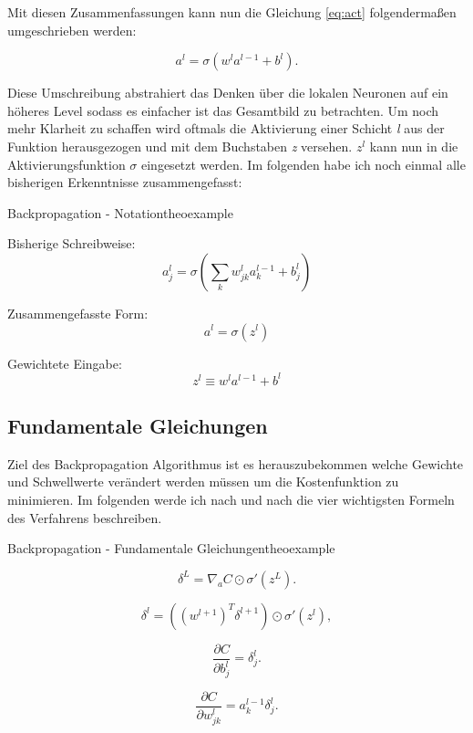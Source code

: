 Mit diesen Zusammenfassungen kann nun die Gleichung \ref{eq:act} folgendermaßen umgeschrieben werden: 

\begin{equation}
  a^{l} = \sigma(w^l a^{l-1}+b^l).
\end{equation}

Diese Umschreibung abstrahiert das Denken über die lokalen Neuronen auf ein höheres Level sodass es einfacher ist das Gesamtbild zu betrachten. Um noch mehr Klarheit zu schaffen wird oftmals die Aktivierung einer Schicht \emph{l} aus der Funktion herausgezogen und mit dem Buchstaben \emph{z} versehen. $z^l$ kann nun in die Aktivierungsfunktion $\sigma$ eingesetzt werden. Im folgenden habe ich noch einmal alle bisherigen Erkenntnisse zusammengefasst: 

\begin{mytheo}{Backpropagation - Notation}{theoexample}

Bisherige Schreibweise:
\begin{equation}
  a^{l}_j = \sigma\left( \sum_k w^{l}_{jk} a^{l-1}_k + b^l_j \right) \nonumber
\end{equation}

Zusammengefasste Form:
\begin{equation}
a^l = \sigma(z^l)
\end{equation}

Gewichtete Eingabe:
\begin{equation}
  z^l \equiv w^l a^{l-1}+b^l
\end{equation}

\end{mytheo}

\subsection{Fundamentale Gleichungen}

Ziel des Backpropagation Algorithmus ist es herauszubekommen welche Gewichte und Schwellwerte verändert werden müssen um die Kostenfunktion zu minimieren. Im folgenden werde ich nach und nach die vier wichtigsten Formeln des Verfahrens beschreiben. 

\begin{mytheo}{Backpropagation - Fundamentale Gleichungen}{theoexample} \label{theo:zus}

\begin{equation} \label{eq:error}
\delta^L = \nabla_a C \odot \sigma'(z^L).
\end{equation}

\begin{equation}
\delta^l = ((w^{l+1})^T \delta^{l+1}) \odot \sigma'(z^l),
\end{equation}

\begin{equation}
\frac{\partial C}{\partial b^l_j} = \delta^l_j.
\end{equation}

\begin{equation}
\frac{\partial C}{\partial w^l_{jk}} = a^{l-1}_k \delta^l_j.
\end{equation}

\end{mytheo}


